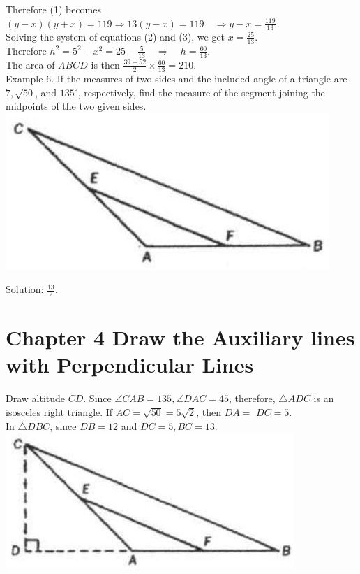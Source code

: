 \documentclass[10pt]{article}
\begin{document}
Therefore (1) becomes\\
\((y-x)(y+x)=119 \Rightarrow 13(y-x)=119 \quad \Rightarrow y-x=\frac{119}{13}\)\\
Solving the system of equations (2) and (3), we get \(x=\frac{25}{13}\).\\
Therefore \(h^{2}=5^{2}-x^{2}=25-\frac{5}{13} \quad \Rightarrow \quad h=\frac{60}{13}\).\\
The area of \(A B C D\) is then \(\frac{39+52}{2} \times \frac{60}{13}=210\).\\
Example 6. If the measures of two sides and the included angle of a triangle are \(7, \sqrt{50}\), and \(135^{\circ}\), respectively, find the measure of the segment joining the midpoints of the two given sides.\\
\includegraphics[max width=\textwidth, center]{2025_04_17_97bc1f7e44d93c271a88g-078}

Solution: \(\frac{13}{2}\).

\section*{Chapter 4 Draw the Auxiliary lines with Perpendicular Lines}
Draw altitude \(C D\). Since \(\angle C A B=135, \angle D A C=45\), therefore, \(\triangle A D C\) is an isosceles right triangle. If \(A C=\sqrt{50}=5 \sqrt{2}\), then \(D A=\) \(D C=5\).\\
In \(\triangle D B C\), since \(D B=12\) and \(D C=5, B C=13\).\\
\includegraphics[max width=\textwidth, center]{2025_04_17_97bc1f7e44d93c271a88g-079}
\end{document}
